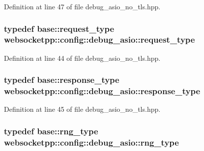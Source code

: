 Definition at line 47 of file debug\+\_\+asio\+\_\+no\+\_\+tls.\+hpp.

\hypertarget{structwebsocketpp_1_1config_1_1debug__asio_a4e52af4648f2afcd527b3e5587d8c8ea}{}
\subsubsection[{request\+\_\+type}]{\setlength{\rightskip}{0pt plus 5cm}typedef {\bf base\+::request\+\_\+type} {\bf websocketpp\+::config\+::debug\+\_\+asio\+::request\+\_\+type}}\label{structwebsocketpp_1_1config_1_1debug__asio_a4e52af4648f2afcd527b3e5587d8c8ea}


Definition at line 44 of file debug\+\_\+asio\+\_\+no\+\_\+tls.\+hpp.

\hypertarget{structwebsocketpp_1_1config_1_1debug__asio_ac59f3572fc37e0ebe1ffbfcd4d4f006b}{}
\subsubsection[{response\+\_\+type}]{\setlength{\rightskip}{0pt plus 5cm}typedef {\bf base\+::response\+\_\+type} {\bf websocketpp\+::config\+::debug\+\_\+asio\+::response\+\_\+type}}\label{structwebsocketpp_1_1config_1_1debug__asio_ac59f3572fc37e0ebe1ffbfcd4d4f006b}


Definition at line 45 of file debug\+\_\+asio\+\_\+no\+\_\+tls.\+hpp.

\hypertarget{structwebsocketpp_1_1config_1_1debug__asio_a9791c89350a790dd652cd7944cde3a3d}{}
\subsubsection[{rng\+\_\+type}]{\setlength{\rightskip}{0pt plus 5cm}typedef {\bf base\+::rng\+\_\+type} {\bf websocketpp\+::config\+::debug\+\_\+asio\+::rng\+\_\+type}}\label{structwebsocketpp_1_1config_1_1debug__asio_a9791c89350a790dd652cd7944cde3a3d}


